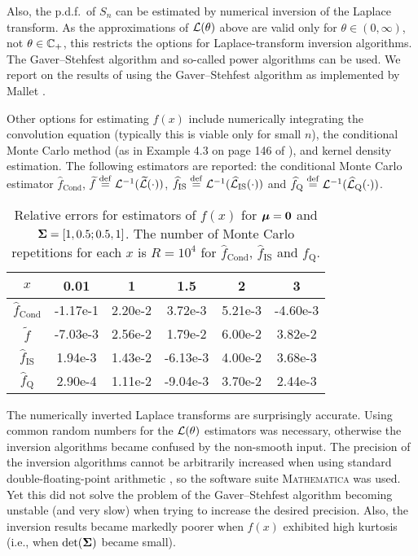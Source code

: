 Also, the p.d.f.\ of $S_n$ can be estimated by numerical inversion of the
Laplace transform. As the approximations of $\mathcal{L}(\theta)$ above are
valid only for $\theta \in (0, \infty)$, not $\theta \in \mathbb{C}_{+}$, this
restricts the options for Laplace-transform inversion algorithms. The
Gaver--Stehfest algorithm \cite{stehfest1970algorithm} and so-called power
algorithms \cite{avdis2007power} can be used. We report on the results of
using the Gaver--Stehfest algorithm as implemented by Mallet
\cite{mallet1985numerical}.

Other options for estimating $f(x)$ include numerically integrating the
convolution equation (typically this is viable only for small $n$), the
conditional Monte Carlo method (as in Example 4.3 on page 146 of
\cite{asmussen2007stochastic}), and kernel density estimation. The following
estimators are reported: the conditional Monte Carlo estimator
$\widehat{f}_{\mathrm{Cond}}$, $\widetilde{f} \overset{\mathrm{def}}{=}
\mathcal{L}^{-1}(\widetilde{\mathcal{L}}(\cdot))$, $\widehat{f}_{\mathrm{IS}} \overset{\mathrm{def}}{=}
\mathcal{L}^{-1}(\widehat{\mathcal{L}}_{\mathrm{IS}}(\cdot))$ and
$\widehat{f}_{\mathrm{Q}} \overset{\mathrm{def}}{=}
\mathcal{L}^{-1}(\widehat{\mathcal{L}}_{\mathrm{Q}}(\cdot))$.

\begin{table}[ht]
\centering
\caption{Relative errors for estimators of $f(x)$ for $\bm{\mu} = \bm{0}$ and
  $\bm{\Sigma} = [1, 0.5; 0.5, 1]$. The number of Monte Carlo repetitions for
  each $x$ is $R=10^4$ for $\widehat{f}_{\mathrm{Cond}}$,
  $\widehat{f}_{\mathrm{IS}} $ and $\widehat{f}_{\mathrm{Q}} $.}
\vspace{3pt}
\begin{tabular}{cccccc}
\hline
{$x$}& 0.01 & 1 & 1.5 & 2 & 3 \\ \hline
$\widehat{f}_{\mathrm{Cond}}$\raisebox{1pt}{\vphantom{$\widehat{f}$}}&
{-1.17e-1 }& {2.20e-2 }& {3.72e-3 }& {5.21e-3 }& {-4.60e-3 } \\
{$\widetilde{f}$}&
{-7.03e-3}& {2.56e-2 }& {1.79e-2 }& {6.00e-2 }& {3.82e-2 } \\
{$\widehat{f}_{\mathrm{IS}}$}&
{1.94e-3 }& {1.43e-2 }& {-6.13e-3}& {4.00e-2 }& {3.68e-3 } \\
{$\widehat{f}_{\mathrm{Q}}$}&
{2.90e-4 }& {1.11e-2 }& {-9.04e-3}& {3.70e-2 }& {2.44e-3 } \\ \hline
\end{tabular}
\end{table}

The numerically inverted Laplace transforms are surprisingly accurate. Using
common random numbers for the $\mathcal{L}(\theta)$ estimators was necessary,
otherwise the inversion algorithms became confused by the non-smooth
input. The precision of the inversion algorithms cannot be arbitrarily
increased when using standard double-floating-point arithmetic
\cite{abate2006unified}, so the software suite \textsc{Mathematica} was
used. Yet this did not solve the problem of the Gaver--Stehfest algorithm
becoming unstable (and very slow) when trying to increase the desired
precision. Also, the inversion results became markedly poorer when $f(x)$
exhibited high kurtosis (i.e., when $\det(\bm{\Sigma})$ became small).


